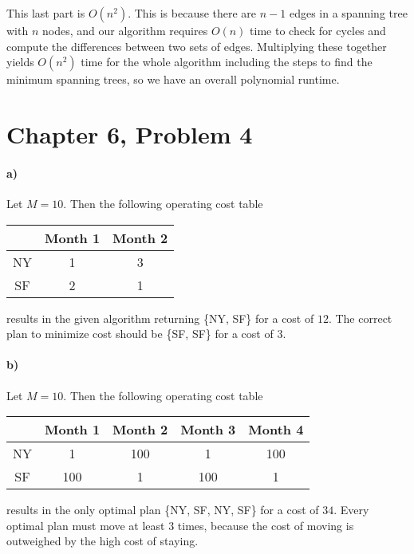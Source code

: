 \documentclass[12pt]{article}
\begin{document}
This last part is \(O(n^2)\). This is because there are \(n-1\) edges in a spanning tree with \(n\) nodes, and our algorithm requires \(O(n)\) time to
check for cycles and compute the differences between two sets of edges. Multiplying these together yields \(O(n^2)\) time for the whole algorithm including the steps
to find the minimum spanning trees, so we have an overall polynomial runtime.

\pagebreak

\section*{Chapter 6, Problem 4}

\paragraph{a)}

Let \(M=10\). Then the following operating cost table
\begin{center}
        \begin{tabular}{c | c c}
                & Month 1 & Month 2\\
                \hline
                NY & 1 & 3\\
                SF & 2 & 1\\
        \end{tabular}
\end{center}
results in the given algorithm returning \{NY, SF\} for a cost of \(12\). The correct plan to minimize
cost should be \{SF, SF\} for a cost of \(3\).

\paragraph{b)}

Let \(M=10\). Then the following operating cost table
\begin{center}
        \begin{tabular}{c | c c c c}
                & Month 1 & Month 2 & Month 3 & Month 4\\
                \hline
                NY & 1 & 100 & 1 & 100\\
                SF & 100 & 1 & 100 & 1 \\
        \end{tabular}
\end{center}
results in the only optimal plan \{NY, SF, NY, SF\} for a cost of \(34\). Every optimal plan must move at least
\(3\) times, because the cost of moving is outweighed by the high cost of staying.
\end{document}
